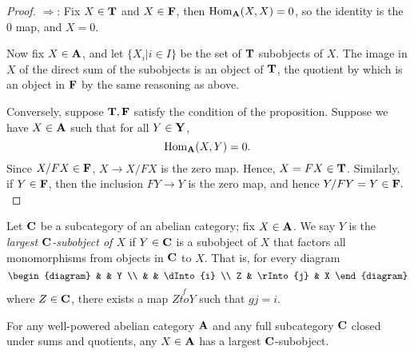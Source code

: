 \begin{proof}
\noindent $\Rightarrow$: Fix $X \in \mathbf{T}$ and $X \in \mathbf{F}$, 
then $\mathrm{Hom}_{\mathbf{A}}(X,X) = 0$, so the identity is the 0 map, and
$X = 0$.

Now fix $X \in \mathbf{A}$, and let $\{X_i | i \in I\}$ be the set
of $\mathbf{T}$ subobjects of $X$. The image in $X$ of the direct 
sum of the subobjects is an object of $\mathbf{T}$, the quotient by 
which is an object in $\mathbf{F}$ by the same reasoning as above.

Conversely, suppose $\mathbf{T}, \mathbf{F}$ satisfy the condition of 
the proposition. Suppose we have $X \in \mathbf{A}$ such that for all
$Y \in \mathbf{Y}$,
\[
\mathrm{Hom}_{\mathbf{A}}(X, Y) = 0.
\]
Since $X/FX \in \mathbf{F}$, $X \to X/FX$ is the zero map. Hence, $X 
= FX \in \mathbf{T}$. Similarly, if $Y \in \mathbf{F}$, then the 
inclusion $FY \to Y$ is the zero map, and hence $Y/FY = Y \in 
\mathbf{F}.$
\end{proof}

\begin{definition}
Let $\mathbf{C}$ be a subcategory of an abelian category; fix $X \in
\mathbf{A}$. We say $Y$ is the \emph{largest $\mathbf{C}$-subobject of 
$X$} if $Y \in \mathbf{C}$ is a subobject of $X$ that factors all 
monomorphisms from objects in $\mathbf{C}$ to $X$. That is, for 
every diagram
\[
\begin{diagram}
  &           & Y         \\
  &           & \dInto{i} \\
Z & \rInto{j} & X
\end{diagram}
\]
where $Z \in \mathbf{C}$, there exists a map $Z \stackrel{f}{to} Y$ 
such that $gj = i$.
\end{definition}

\begin{por}
For any well-powered abelian category $\mathbf{A}$ and any full 
subcategory $\mathbf{C}$ closed under sums and quotients, any $X \in 
\mathbf{A}$ has a largest $\mathbf{C}$-subobject.
\end{por}


